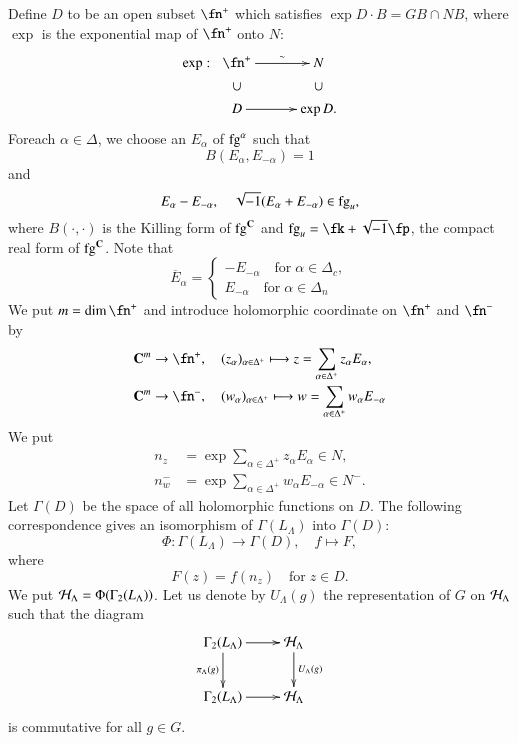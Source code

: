 \noindent
Define $D$ to be an open subset $\fn^{+}$ which satisfies $\exp D \cdot B=GB \cap N B$, where $\exp$ is the exponential map of $\fn^{+}$ onto $N$:
$$
\xymatrix@R=.1cm@C=.1cm{
\exp:  &  \fn^{+} \ar[rrrr]^-{\sim} &&&& N\\
       & \cup  &&&& \cup\\
       & D\ar[rrrr] &&&& \exp D.
      }
$$
For\pageoriginale each $\alpha \in \Delta$, we choose an $E_{\alpha}$ of $\operatorname{fg}^{\alpha}$ such that
$$
B(E_{\alpha}, E_{-\alpha})=1
$$
and
$$
E_{\alpha}-E_{-\alpha}, \quad \sqrt{-1}(E_{\alpha} + E_{-\alpha}) \in \operatorname{fg}_{u},
$$
where $B(\cdot, \cdot)$ is the Killing form of $\operatorname{fg}^{\mathbf{C}}$ and $\fg_{u}= \fk + \sqrt{-1}\fp$, the compact real form of $\operatorname{fg}^{\mathbf{C}}$. Note that
$$
\overline{E}_{\alpha}= \left\{\begin{matrix}
-E_{-\alpha} \quad \text{for}\; \alpha \in \Delta_{c},\\
E_{-\alpha}\quad \text{for}\; \alpha \in \Delta_{n}
\end{matrix}
\right.
$$
We put $m=\dim \fn^{+}$ and introduce holomorphic coordinate on $\fn^{+}$ and $\fn^{-}$ by
\begin{align*}
&\bC^{m} \rightarrow \fn^{+},\quad (z_{\alpha})_{\alpha \in \Delta^{+}} \longmapsto z = \sum\limits_{\alpha \in \Delta^{+}}z_{\alpha}E_{\alpha},\\
&\bC^{m} \rightarrow \fn^{-},\quad (w_{\alpha})_{\alpha \in \Delta^{+}} \longmapsto w = \sum\limits_{\alpha \in \Delta^{+}}w_{\alpha}E_{-\alpha}
\end{align*}
We put
\begin{align*}
n_{z} &= \exp \sum\limits_{\alpha \in \Delta^{+}} z_{\alpha}E_{\alpha} \in N,\\
n_{w}^{-}&= \exp \sum\limits_{\alpha \in \Delta^{+}} w_{\alpha}E_{-\alpha} \in N^{-}.
\end{align*}
Let $\Gamma(D)$ be the space of all holomorphic functions on $D$. The following correspondence gives an isomorphism of $\Gamma(L_{\Lambda})$ into $\Gamma(D)$:
$$
\Phi : \Gamma(L_{\Lambda}) \longrightarrow \Gamma(D), \quad f \longmapsto F,
$$
where
$$
F(z)=f(n_{z}) \quad \text{for} \; z \in D.
$$
We put $\mathcal{H}_{\Lambda}= \Phi(\Gamma_{2}(L_{\Lambda}))$. Let us denote by $U_{\Lambda}(g)$ the representation of $G$ on $\mathcal{H}_{\Lambda}$ such that the diagram
$$
\xymatrix{
\Gamma_{2}(L_{\Lambda})\ar[r]\ar[d]_-{\pi_{\Lambda}(g)} & \calH_{\Lambda} \ar[d]^-{U_{\Lambda}(g)}\\
\Gamma_{2}(L_{\Lambda})\ar[r] &\calH_{\Lambda}
}
$$
is commutative for all $g \in G$.

